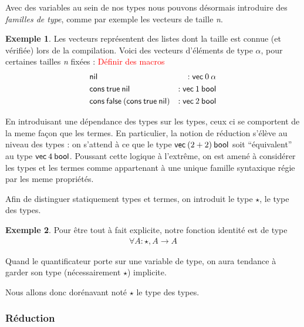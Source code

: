 \documentclass {article}
\theoremstyle{definition}
\newtheorem{example}{Exemple}
\theoremstyle{remark}
\newcommand{\todo}[1]{\textcolor{red}{#1}}
\begin{document}
\newcommand{\nil}{\ensuremath{\mathsf{nil}}}
\newcommand{\cons}{\ensuremath{\mathsf{cons}}}
\newcommand{\Vect}{\ensuremath{\mathsf{vec}}}

Avec des variables au sein de nos types nous pouvons désormais introduire des \emph{familles de type},
comme par exemple les vecteurs de taille \emph{n}.
\begin{example}  
  \label{example vecteur}
  Les vecteurs représentent des listes dont la taille est connue (et
  vérifiée) lors de la compilation. Voici des vecteurs d'éléments de
  type $\alpha$, pour certaines tailles \emph{n} fixées : \todo{Définir des macros}
  \begin{align*}
    &\nil &: \Vect\: 0\: \alpha \\
    &\cons\: \true\: \nil &: \Vect\: 1\: \bool \\
    &\cons\: \false\: (\cons\: \true\: \nil) &: \Vect\: 2\: \bool \\
  \end{align*}
\end{example}
En introduisant une dépendance des types sur les types, ceux ci se
comportent de la meme façon que les termes. En particulier, la notion
de réduction s'élève au niveau des types : on s'attend à ce que le
type \(\Vect\: (2 + 2)\: \bool\) soit ``équivalent'' au type \(\Vect\:
4\: \bool\).  Poussant cette logique à l'extrême, on est amené à
considérer les types et les termes comme appartenant à une unique
famille syntaxique régie par les meme propriétés.

Afin de distinguer statiquement types et termes, on introduit le type
$\star$, le type des types.
\begin{example}
  Pour être tout à fait explicite, notre fonction identité est de type
  \begin{align*}
    \forall A : \star, A \rightarrow A
  \end{align*}
  
  Quand le quantificateur porte sur une variable de type, on aura
  tendance à garder son type (nécessairement $\star$) implicite.

\end{example}
Nous allons donc dorénavant noté $\star$ le type des types.




\subsubsection{Réduction}
\label{maj_eval}
\end{document}
